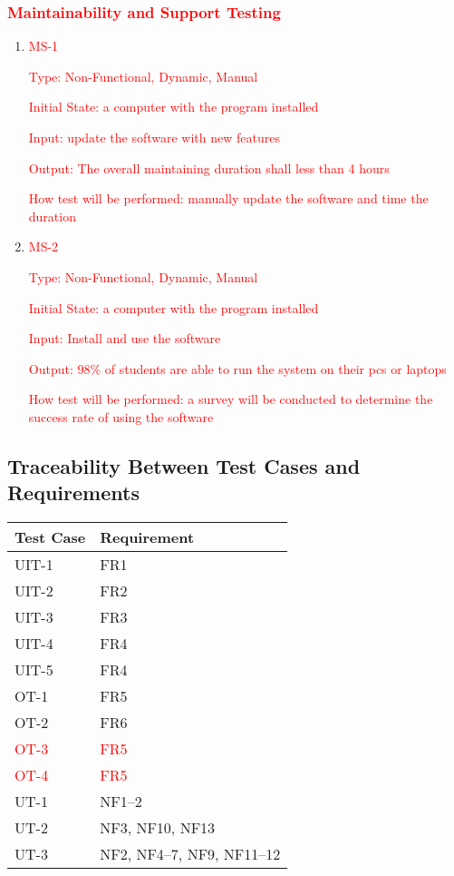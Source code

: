 \documentclass[12pt, titlepage]{article}
\begin{document}
\subsubsection{\textcolor{red}{Maintainability and Support Testing}}

  \begin{enumerate}
    \item {\textcolor{red}{MS-1}}
    
    \textcolor{red}{Type: Non-Functional, Dynamic, Manual} 
  
    \textcolor{red}{Initial State: a computer with the program installed} 
  
    \textcolor{red}{Input: update the software with new features} 
  
    \textcolor{red}{Output: The overall maintaining duration shall less than 4 hours} 

    \textcolor{red}{How test will be performed: manually update the software and time the duration}


    \item {\textcolor{red}{MS-2}}

    \textcolor{red}{Type: Non-Functional, Dynamic, Manual} 
  
    \textcolor{red}{Initial State: a computer with the program installed} 
  
    \textcolor{red}{Input: Install and use the software} 
  
    \textcolor{red}{Output: 98\% of students are able to run the system on their pcs or laptops } 

    \textcolor{red}{How test will be performed: a survey will be conducted to determine the success rate of using the software}

  \end{enumerate}

\subsection{Traceability Between Test Cases and Requirements}

\begin{table}[H]
  \begin{tabularx}{1.0\linewidth}[H]{ll}
    \toprule
    Test Case & Requirement \\
    \midrule
    UIT-1 & FR1 \\
    UIT-2 & FR2 \\
    UIT-3 & FR3 \\
    UIT-4 & FR4 \\
    UIT-5 & FR4 \\
    OT-1 & FR5 \\
    OT-2 & FR6 \\
    \textcolor{red}{OT-3} & \textcolor{red}{FR5} \\
    \textcolor{red}{OT-4} & \textcolor{red}{FR5} \\
    \midrule
    UT-1 & NF1--2 \\
    UT-2 & NF3, NF10, NF13 \\
    UT-3 & NF2, NF4--7, NF9, NF11--12 \\
    \bottomrule
  \end{tabularx}
\end{table}
\end{document}
